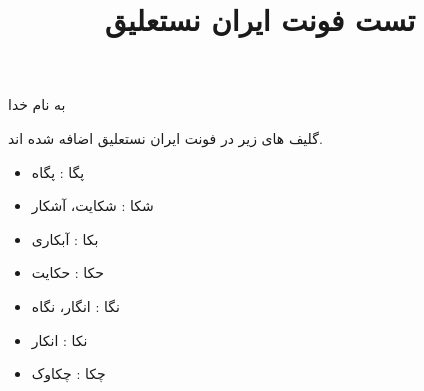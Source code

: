 \documentclass[14pt,a4paper]{article}
\begin{document}
\title{تست فونت ایران نستعلیق}
\author{ }
\date{ }
\maketitle


\begin{center}
به نام خدا
\end{center}

گلیف های زیر در فونت ایران نستعلیق اضافه شده اند.

\begin{itemize}
\item 
پگا : پگاه
\item 
شکا : شکایت، آشکار
\item
بکا : آبکاری
\item
حکا : حکایت
\item
نگا : انگار، نگاه
\item
نکا : انکار
\item
چکا : چکاوک
\end{itemize}
\end{document}
